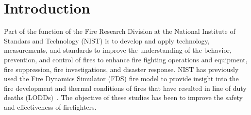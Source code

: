 \documentclass[12pt,oneside]{book}
\begin{document}


\chapter{Introduction}
\label{sec:introduction}
\setcounter{page}{1}

Part of the function of the Fire Research Division at the National Institute of Standars and Technology (NIST) is to develop and apply technology, measurements, and standards to improve the understanding of the behavior, prevention, and control of fires to enhance fire fighting operations and equipment, fire suppression, fire investigations, and disaster response. NIST has previously used the Fire Dynamics Simulator (FDS) fire model to provide insight into the fire development and thermal conditions of fires that have resulted in line of duty deaths (LODDs)~\cite{Madrzykowski:1,Iowa,Texas,Bryner:Charleston,barowy:texas,Weinschenk:Chicago}. The objective of these studies has been to improve the safety and effectiveness of firefighters.
\end{document}
